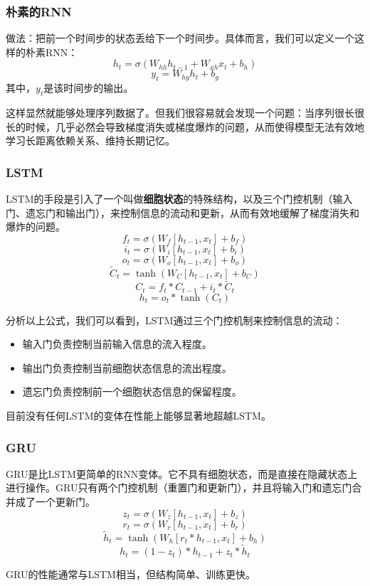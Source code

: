 \documentclass[aspectratio=1610]{ctexbeamer}
\begin{document}
\begin{frame}
    \frametitle{朴素的RNN}

    做法：把前一个时间步的状态丢给下一个时间步。具体而言，我们可以定义一个这样的朴素RNN：
    \[ h_t = \sigma(W_{hh} h_{t-1} + W_{xh} x_t + b_h) \]
    \[ y_t = W_{hy} h_t + b_y \]
    其中，$y_t$是该时间步的输出。

    这样显然就能够处理序列数据了。但我们很容易就会发现一个问题：当序列很长很长的时候，几乎必然会导致梯度消失或梯度爆炸的问题，从而使得模型无法有效地学习长距离依赖关系、维持长期记忆。

\end{frame}

\begin{frame}
    \frametitle{LSTM}

    LSTM的手段是引入了一个叫做\textbf{细胞状态}的特殊结构，以及三个门控机制（输入门、遗忘门和输出门），来控制信息的流动和更新，从而有效地缓解了梯度消失和爆炸的问题。
    \[ f_t = \sigma(W_f [h_{t-1}, x_t] + b_f) \]
    \[ i_t = \sigma(W_i [h_{t-1}, x_t] + b_i) \]
    \[ o_t = \sigma(W_o [h_{t-1}, x_t] + b_o) \]
    \[ \tilde{C}_t = \tanh(W_C [h_{t-1}, x_t] + b_C) \]
    \[ C_t = f_t * C_{t-1} + i_t * \tilde{C}_t \] 
    \[ h_t = o_t * \tanh(C_t) \]
    
    分析以上公式，我们可以看到，LSTM通过三个门控机制来控制信息的流动：
    \begin{itemize}
        \item 输入门负责控制当前输入信息的流入程度。
        \item 输出门负责控制当前细胞状态信息的流出程度。
        \item 遗忘门负责控制前一个细胞状态信息的保留程度。
    \end{itemize}
    目前没有任何LSTM的变体在性能上能够显著地超越LSTM。

\end{frame}

\begin{frame}
    \frametitle{GRU}

    GRU是比LSTM更简单的RNN变体。它不具有细胞状态，而是直接在隐藏状态上进行操作。GRU只有两个门控机制（重置门和更新门），并且将输入门和遗忘门合并成了一个更新门。
    \[ z_t = \sigma(W_z [h_{t-1}, x_t] + b_z) \]
    \[ r_t = \sigma(W_r [h_{t-1}, x_t] + b_r) \]
    \[ \tilde{h}_t = \tanh(W_h [r_t * h_{t-1}, x_t] + b_h) \]
    \[ h_t = (1 - z_t) * h_{t-1} + z_t * \tilde{h}_t \]

    GRU的性能通常与LSTM相当，但结构简单、训练更快。

\end{frame}
\end{document}
